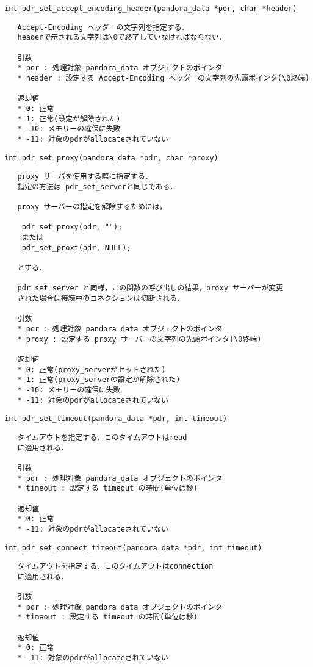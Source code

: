 {\large\verb|int pdr_set_accept_encoding_header(pandora_data *pdr, char *header)|}
\begin{verbatim}
   Accept-Encoding ヘッダーの文字列を指定する．
   headerで示される文字列は\0で終了していなければならない．

   引数
   * pdr : 処理対象 pandora_data オブジェクトのポインタ
   * header : 設定する Accept-Encoding ヘッダーの文字列の先頭ポインタ(\0終端)

   返却値
   * 0: 正常
   * 1: 正常(設定が解除された)
   * -10: メモリーの確保に失敗
   * -11: 対象のpdrがallocateされていない
\end{verbatim}
{\large\verb|int pdr_set_proxy(pandora_data *pdr, char *proxy)|}
\begin{verbatim}
   proxy サーバを使用する際に指定する．
   指定の方法は pdr_set_serverと同じである．

   proxy サーバーの指定を解除するためには，

    pdr_set_proxy(pdr, "");
    または
    pdr_set_proxt(pdr, NULL);

   とする．

   pdr_set_server と同様，この関数の呼び出しの結果，proxy サーバーが変更
   された場合は接続中のコネクションは切断される．

   引数
   * pdr : 処理対象 pandora_data オブジェクトのポインタ
   * proxy : 設定する proxy サーバーの文字列の先頭ポインタ(\0終端)

   返却値
   * 0: 正常(proxy_serverがセットされた)
   * 1: 正常(proxy_serverの設定が解除された)
   * -10: メモリーの確保に失敗
   * -11: 対象のpdrがallocateされていない
\end{verbatim}
{\large\verb|int pdr_set_timeout(pandora_data *pdr, int timeout)|}
\begin{verbatim}
   タイムアウトを指定する．このタイムアウトはread
   に適用される．

   引数
   * pdr : 処理対象 pandora_data オブジェクトのポインタ
   * timeout : 設定する timeout の時間(単位は秒)

   返却値
   * 0: 正常
   * -11: 対象のpdrがallocateされていない
\end{verbatim}
{\large\verb|int pdr_set_connect_timeout(pandora_data *pdr, int timeout)|}
\begin{verbatim}
   タイムアウトを指定する．このタイムアウトはconnection
   に適用される．

   引数
   * pdr : 処理対象 pandora_data オブジェクトのポインタ
   * timeout : 設定する timeout の時間(単位は秒)

   返却値
   * 0: 正常
   * -11: 対象のpdrがallocateされていない
\end{verbatim}
